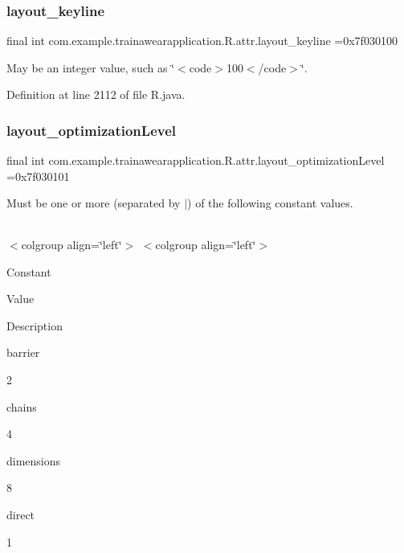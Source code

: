 \subsubsection{\texorpdfstring{layout\_keyline}{layout\_keyline}}
{\footnotesize\ttfamily final int com.\+example.\+trainawearapplication.\+R.\+attr.\+layout\+\_\+keyline =0x7f030100\hspace{0.3cm}{\ttfamily [static]}}

May be an integer value, such as \char`\"{}$<$code$>$100$<$/code$>$\char`\"{}. 

Definition at line 2112 of file R.\+java.

\mbox{\label{classcom_1_1example_1_1trainawearapplication_1_1_r_1_1attr_a846b800d2524edf4d9d3f2201fff7247}} 
\subsubsection{\texorpdfstring{layout\_optimizationLevel}{layout\_optimizationLevel}}
{\footnotesize\ttfamily final int com.\+example.\+trainawearapplication.\+R.\+attr.\+layout\+\_\+optimization\+Level =0x7f030101\hspace{0.3cm}{\ttfamily [static]}}

Must be one or more (separated by \textquotesingle{}$\vert$\textquotesingle{}) of the following constant values.

\tabulinesep=1mm
\begin{longtabu}spread 0pt [c]{*{0}{|X[-1]}|}
\hline
\end{longtabu}
$<$colgroup align=\char`\"{}left\char`\"{}$>$ $<$colgroup align=\char`\"{}left\char`\"{}$>$ 

Constant

Value

Description 

barrier

2

chains

4

dimensions

8

direct

1

